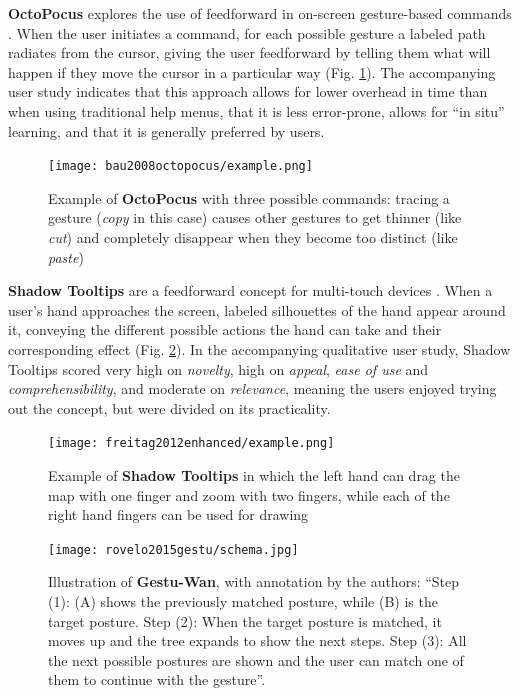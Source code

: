 \textbf{OctoPocus} explores the use of feedforward in on-screen gesture-based commands \cite{bau2008octopocus}. When the user initiates a command, for each possible gesture a labeled path radiates from the cursor, giving the user feedforward by telling them what will happen if they move the cursor in a particular way (Fig. \ref{fig:bau2008octopocus_demo}). The accompanying user study indicates that this approach allows for lower overhead in time than when using traditional help menus, that it is less error-prone, allows for ``in situ'' learning, and that it is generally preferred by users.

\begin{figure}
    \centering
    \texttt{[image: bau2008octopocus/example.png]}
    \caption{Example of \textbf{OctoPocus} with three possible commands: tracing a gesture (\textit{copy} in this case) causes other gestures to get thinner (like \textit{cut}) and completely disappear when they become too distinct (like \textit{paste}) \cite{bau2008octopocus}}
    \label{fig:bau2008octopocus_demo}
\end{figure}

\textbf{Shadow Tooltips} are a feedforward concept for multi-touch devices \cite{freitag2012enhanced}. When a user's hand approaches the screen, labeled silhouettes of the hand appear around it, conveying the different possible actions the hand can take and their corresponding effect (Fig. \ref{fig:freitag2012enhanced_demo}). In the accompanying qualitative user study, Shadow Tooltips scored very high on \textit{novelty}, high on \textit{appeal}, \textit{ease of use} and \textit{comprehensibility}, and moderate on \textit{relevance}, meaning the users enjoyed trying out the concept, but were divided on its practicality.

\begin{figure}
    \centering
    \texttt{[image: freitag2012enhanced/example.png]}
    \caption{Example of \textbf{Shadow Tooltips} in which the left hand can drag the map with one finger and zoom with two fingers, while each of the right hand fingers can be used for drawing \cite{freitag2012enhanced}}
    \label{fig:freitag2012enhanced_demo}
\end{figure}



\begin{figure}
    \centering
    \texttt{[image: rovelo2015gestu/schema.jpg]}
    \caption{Illustration of \textbf{Gestu-Wan}, with annotation by the authors: ``Step (1): (A) shows the previously matched posture, while (B) is the target posture. Step (2): When the target posture is matched, it moves up and the tree expands to show the next steps. Step (3): All the next possible postures are shown and the user can match one of them to continue with the gesture''. \cite{freitag2012enhanced}}
    \label{fig:rovelo2015gestu_schema}
\end{figure}

